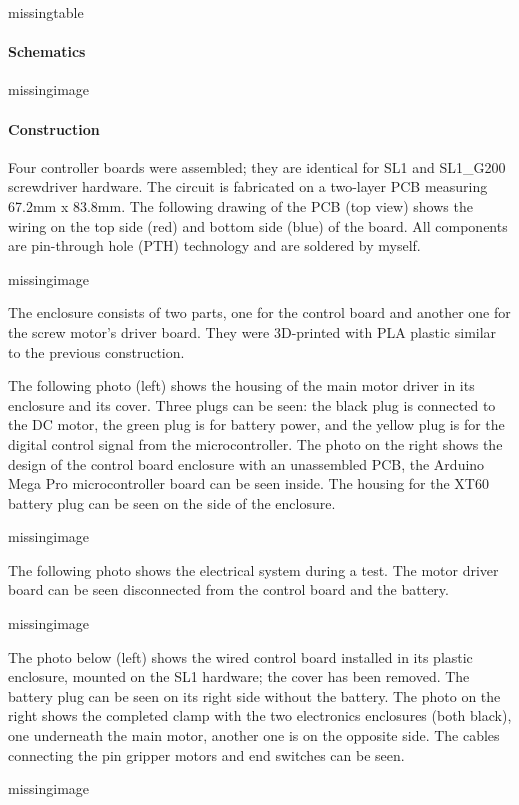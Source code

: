 missingtable

\paragraph{Schematics}

missingimage

\paragraph{Construction}
Four controller boards were assembled; they are identical for SL1 and SL1\_G200 screwdriver hardware. The circuit is fabricated on a two-layer PCB measuring 67.2mm x 83.8mm. The following drawing of the PCB (top view) shows the wiring on the top side (red) and bottom side (blue) of the board. All components are pin-through hole (PTH) technology and are soldered by myself.

missingimage

The enclosure consists of two parts, one for the control board and another one for the screw motor’s driver board. They were 3D-printed with PLA plastic similar to the previous construction. 

The following photo (left) shows the housing of the main motor driver in its enclosure and its cover. Three plugs can be seen: the black plug is connected to the DC motor, the green plug is for battery power, and the yellow plug is for the digital control signal from the microcontroller. The photo on the right shows the design of the control board enclosure with an unassembled PCB, the Arduino Mega Pro microcontroller board can be seen inside. The housing for the XT60 battery plug can be seen on the side of the enclosure. 

missingimage

The following photo shows the electrical system during a test. The motor driver board can be seen disconnected from the control board and the battery.

missingimage

The photo below (left) shows the wired control board installed in its plastic enclosure, mounted on the SL1 hardware; the cover has been removed. The battery plug can be seen on its right side without the battery. The photo on the right shows the completed clamp with the two electronics enclosures (both black), one underneath the main motor, another one is on the opposite side. The cables connecting the pin gripper motors and end switches can be seen.

missingimage

